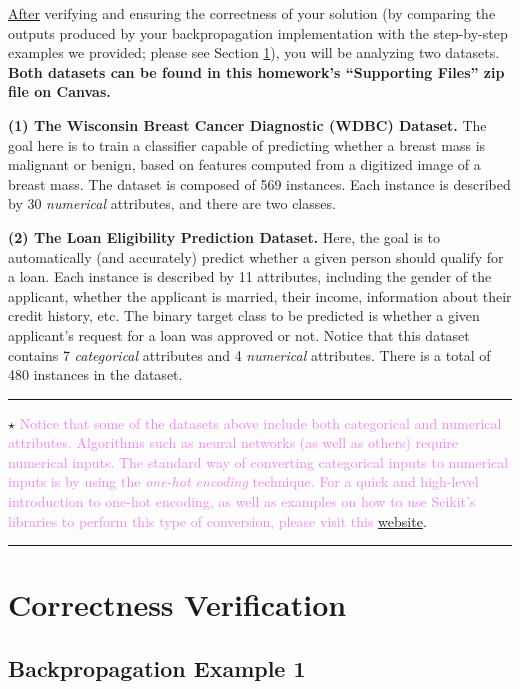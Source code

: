 \documentclass[letterpaper]{article}
\begin{document}
\underline{After} verifying and ensuring the correctness of your solution (by comparing the outputs produced by your backpropagation implementation with the step-by-step examples we provided; please see Section \ref{correctness_verif}), you will be analyzing two datasets. \textbf{Both datasets can be found in this homework's ``Supporting Files'' zip file on Canvas.}

\textbf{(1) The Wisconsin Breast Cancer Diagnostic (WDBC) Dataset.}
The goal here is to train a classifier capable of predicting whether a breast mass is malignant or benign, based on features computed from a digitized image of a breast mass. The dataset is composed of 569 instances. Each instance is described by 30 \textit{numerical} attributes, and there are two classes.

\textbf{(2) The Loan Eligibility Prediction Dataset.}
Here, the goal is to automatically (and accurately) predict whether a given person should qualify for a loan. Each instance is described by 11 attributes, including the gender of the applicant, whether the applicant is married, their income, information about their credit history, etc. The binary target class to be predicted is whether a given applicant's request for a loan was approved or not. Notice that this dataset contains 7 \textit{categorical} attributes and 4 \textit{numerical} attributes. There is a total of 480 instances in the dataset. 

\noindent\rule{\textwidth}{1pt}
\noindent $\star$ \textcolor{violet}{Notice that some of the datasets above include both categorical and numerical attributes. Algorithms such as neural networks (as well as others) require numerical inputs. The standard way of converting categorical inputs to numerical inputs is by using the \textit{one-hot encoding} technique. For a quick and high-level introduction to one-hot encoding, as well as examples on how to use Scikit's libraries to perform this type of conversion, please visit this \href{https://datagy.io/sklearn-one-hot-encode}{website}}.\\
\noindent\rule{\textwidth}{1pt}



\section{Correctness Verification}
\label{correctness_verif}
\subsection{Backpropagation Example 1}
\end{document}

